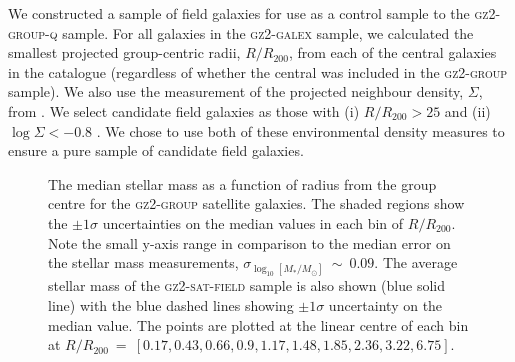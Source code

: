 \documentclass[useAMS,usenatbib]{mn2e}
\begin{document}
We constructed a sample of field galaxies for use as a control sample to the \textsc{gz2-group-q} sample. For all galaxies in the \textsc{gz2-galex} sample, we calculated the smallest projected group-centric radii, $R/R_{200}$, from each of the central galaxies in the \citet{berlind06} catalogue (regardless of whether the central was included in the \textsc{gz2-group} sample). We also use the measurement of the projected neighbour density, $\Sigma$, from \cite{Baldry06}. We select candidate field galaxies as those with (i) $R/R_{200} > 25$ and (ii) $\log\Sigma < -0.8$ \citep[the threshold on the local environment density which selects field galaxies as defined by][]{Baldry06}. We chose to use both of these environmental density measures to ensure a pure sample of candidate field galaxies.

\begin{figure}
\caption[Average mass with group radius in the \textsc{gz2-group} sample]{The median stellar mass as a function of radius from the group centre for the \textsc{gz2-group} satellite galaxies. The shaded regions show the $\pm1\sigma$ uncertainties on the median values in each bin of $R/R_{200}$. Note the small y-axis range in comparison to the median error on the stellar mass measurements, $\sigma_{\log_{10}[M_*/M_{\odot}]}~\sim~0.09$. The average stellar mass of the \textsc{gz2-sat-field} sample is also shown (blue solid line) with the blue dashed lines showing $\pm1\sigma$ uncertainty on the median value. The points are plotted at the linear centre of each bin at $R/R_{200}~=~[0.17,  0.43,  0.66,  0.9 ,  1.17,  1.48,  1.85,  2.36,  3.22,  6.75]$.}
\label{fig:massdep}
\end{figure}
\end{document}
